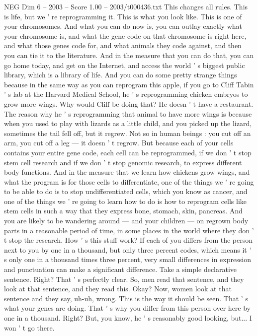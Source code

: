 \begin{textsample}{NEG Dim 6 – 2003 – Score 1.00 – 2003/t000436.txt}
This changes all rules.
This is life, but we ' re reprogramming it.
This is what you look like.
This is one of your chromosomes.
And what you can do now is, you can outlay exactly what your chromosome is, and what the gene code on that chromosome is right here, and what those genes code for, and what animals they code against, and then you can tie it to the literature.
And in the measure that you can do that, you can go home today, and get on the Internet, and access the world ' s biggest public library, which is a library of life.
And you can do some pretty strange things because in the same way as you can reprogram this apple, if you go to Cliff Tabin ' s lab at the Harvard Medical School, he ' s reprogramming chicken embryos to grow more wings.
Why would Cliff be doing that?
He doesn ' t have a restaurant.
The reason why he ' s reprogramming that animal to have more wings is because when you used to play with lizards as a little child, and you picked up the lizard, sometimes the tail fell off, but it regrew.
Not so in human beings : you cut off an arm, you cut off a leg — it doesn ' t regrow.
But because each of your cells contains your entire gene code, each cell can be reprogrammed, if we don ' t stop stem cell research and if we don ' t stop genomic research, to express different body functions.
And in the measure that we learn how chickens grow wings, and what the program is for those cells to differentiate, one of the things we ' re going to be able to do is to stop undifferentiated cells, which you know as cancer, and one of the things we ' re going to learn how to do is how to reprogram cells like stem cells in such a way that they express bone, stomach, skin, pancreas.
And you are likely to be wandering around — and your children — on regrown body parts in a reasonable period of time, in some places in the world where they don ' t stop the research.
How ' s this stuff work?
If each of you differs from the person next to you by one in a thousand, but only three percent codes, which means it ' s only one in a thousand times three percent, very small differences in expression and punctuation can make a significant difference.
Take a simple declarative sentence.
Right?
That ' s perfectly clear.
So, men read that sentence, and they look at that sentence, and they read this.
Okay?
Now, women look at that sentence and they say, uh-uh, wrong.
This is the way it should be seen.
That ' s what your genes are doing.
That ' s why you differ from this person over here by one in a thousand.
Right?
But, you know, he ' s reasonably good looking, but...
I won ' t go there.

\end{textsample}
